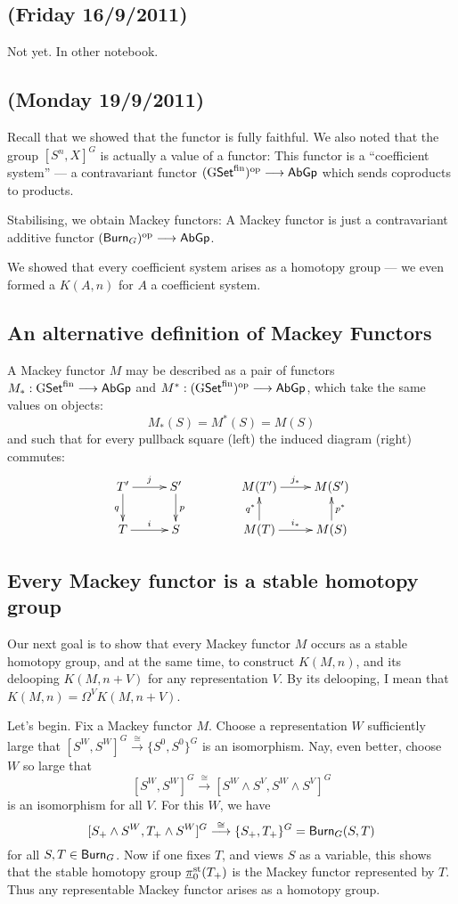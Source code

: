 \documentclass[11pt]{article}
\newcommand{\NewLecture}[3]{\section{#1 {\small(#2/#3/2011)}}}
\begin{document}
\begin{ThirdWeek}
\NewLecture{}{Friday 16}{9} Not yet. In other notebook.
\end{ThirdWeek}
\begin{FourthWeek}
\setcounter{section}{7}
\NewLecture{}{Monday 19}{9} Recall that
we showed that the functor
is fully faithful. We also noted that the group $[S^n,X]^G$ is actually a value of a functor:
This functor is a ``coefficient system'' --- a contravariant functor $(\operatorname{{G\mathsf{Set}^\textup{fin}}})^{\textup{op}}\longrightarrow\operatorname{{\mathsf{AbGp}}}$ which sends coproducts to products.

Stabilising, we obtain Mackey functors:
A Mackey functor is just a contravariant additive functor $(\operatorname{{\mathsf{Burn}}}_G)^{\textup{op}}\longrightarrow\operatorname{{\mathsf{AbGp}}}$.

We showed that every coefficient system arises as a homotopy group --- we even formed a $K(A,n)$ for $A$ a coefficient system.
\subsection*{An alternative definition of Mackey Functors}
A Mackey functor $M$ may be described as a pair of functors $M_*:\operatorname{{G\mathsf{Set}^\textup{fin}}}\longrightarrow\operatorname{{\mathsf{AbGp}}}$ and $M^*:(\operatorname{{G\mathsf{Set}^\textup{fin}}})^{\textup{op}}\longrightarrow\operatorname{{\mathsf{AbGp}}}$, which take the same values on objects:
\[M_*(S)=M^*(S)=M(S)\]
and such that for every pullback square (left) the induced diagram (right) commutes:
\[\xymatrix@!0@R=12mm@C=1.5cm{
\ar[d]_qT'\ar[r]^j&S'\ar[d]^p\\
T\ar[r]^i&S
}\qquad\qquad\xymatrix@!0@R=12mm@C=2.05cm{
\ar[d];[]^{q^*}M(T')\ar[r]^{j_*}&M(S')\ar[d];[]_{p^*}\\
M(T)\ar[r]^{i_*}&M(S)
}\]
\subsection*{Every Mackey functor is a stable homotopy group}
Our next goal is to show that every Mackey functor $M$ occurs as a stable homotopy group, and at the same time, to construct $K(M,n)$, and its delooping $K(M,n+V)$ for any representation $V$. By its delooping, I mean that $K(M,n)=\Omega^VK(M,n+V)$.

Let's begin. Fix a Mackey functor $M$. Choose a representation $W$ sufficiently large that $[S^W,S^W]^G\overset{\cong}{\to}\{S^0,S^0\}^G$ is an isomorphism. Nay, even better, choose $W$ so large that
\[[S^W,S^W]^G\overset{\cong}{\to} [S^W\wedge S^V,S^W\wedge S^V]^G\]
is an isomorphism for all $V$. For this $W$, we have
\[[S_+\wedge S^W,T_+\wedge S^W]^G\overset{\cong}{\longrightarrow}\{S_+,T_+\}^G=\operatorname{{\mathsf{Burn}}}_G(S,T)\]
for all $S,T\in\operatorname{{\mathsf{Burn}}}_G$. 
Now if one fixes $T$, and views $S$ as a variable, this shows that the stable homotopy group $\underline\pi_0^{\textup{st}} (T_+)$ is the Mackey functor represented by $T$. Thus any representable Mackey functor arises as a homotopy group.


\end{FourthWeek}
\end{document}
